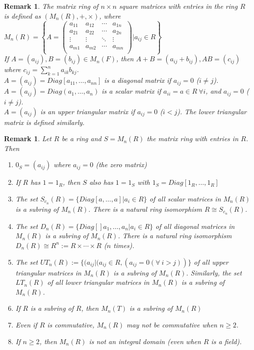 \documentclass[a4paper,sfsidenotes,openany]{tufte-book}
\theoremstyle{theorem}
\newtheorem{remark}[theorem]{Remark}
\begin{document}
\begin{fullwidth}
\begin{remark}
The {{\color{blue} matrix ring of $n \times n$ square matrices with entries in the ring $R$}} is defined as $(M_n(R), +, \times)$, where\\
$M_n(R) = \left\{A=\begin{pmatrix}
a_{11} & a_{12} & \cdots & a_{1n}\\
a_{21} & a_{22} & \cdots & a_{2n}\\
\vdots & \vdots & \ddots & \vdots\\
a_{m1} & a_{m2} & \cdots & a_{mn}\\
\end{pmatrix} | a_{ij} \in R \right\}$\\
If $A = (a_{ij}), B = (b_{ij}) \in M_n(F)$, then $A+B=(a_{ij} + b_{ij}), AB = (c_{ij})$ where $c_{ij} = \sum_{k=1}^{n} a_{ik} b_{kj}$.\\
$A=(a_{ij}) = Diag[a_{11}, \ldots, a_{nn}]$ is a diagonal matrix if $a_{ij} = 0$ ($i \neq j$).\\
$A=(a_{ij}) = Diag(a_1, \ldots, a_n)$ is a scalar matrix if $a_{ii} = a \in R \ \forall i$, and $a_{ij} = 0$ ($i \neq j$).\\
$A=(a_{ij})$ is an upper triangular matrix if $a_{ij}=0$ ($i < j$). The lower triangular matrix is defined similarly.\\
\end{remark}
\>

\begin{remark}
Let $R$ be a ring and $S = M_n(R)$ the matrix ring with entries in $R$. Then
\begin{enumerate}[label=(\roman*),leftmargin=0pt, itemindent=4em, align=left]
\item $0_S=(a_{ij})$ where $a_{ij} = 0$ (the zero matrix)
\item If $R$ has $1 = 1_R$, then $S$ also has $1 = 1_S$ with $1_S = Diag[1_R, \ldots, 1_R]$
\item The set $S_{c_n}(R) = \{Diag[a, \ldots, a] | a_i \in R\}$ of all scalar matrices in $M_n(R)$ is a subring of $M_n(R)$. There is a natural ring isomorphism $R \cong S_{c_n}(R)$.
\item The set $D_n(R) = \{Diag[]a_1, \ldots, a_n | a_i \in R\}$ of all diagonal matrices in $M_n(R)$ is a subring of $M_n(R)$. There is a natural ring isomorphism $D_n(R) \cong R^n := R \times \cdots \times R $ ($n$ times).
\item The set $UT_n(R):= \{(a_{ij} | (a_{ij} \in R, (a_{ij} = 0 (\forall \ i > j))\}$ of all upper triangular matrices in $M_n(R)$ is a subring of $M_n(R)$. Similarly, the set $LT_n(R)$ of all lower triangular matrices in $M_n(R)$ is a subring of $M_n(R)$.
\item If $R$ is a subring of $R$, then $M_n(T)$ is a subring of $M_n(R)$
\item Even if $R$ is commutative, $M_n(R)$ may not be commutative when $n \geq 2$.
\item If $n \geq 2$, then $M_n(R)$ is not an integral domain (even when $R$ is a field).
\end{enumerate}
\end{remark}
\>


\end{fullwidth}
\end{document}
